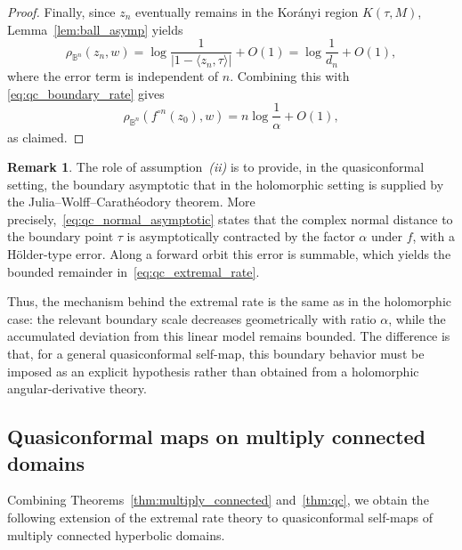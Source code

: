 \documentclass[12pt]{amsart}
\numberwithin{equation}{section}
\theoremstyle{plain}
\theoremstyle{definition}
\newtheorem{remark}[equation]{Remark}
\begin{document}
\begin{proof}
Finally, since $z_n$ eventually remains in the Kor\'anyi region
$K(\tau,M)$, Lemma~\ref{lem:ball_asymp} yields
\begin{equation*}
\rho_{\mathbb{B}^n}(z_n,w)
=
\log\frac{1}{|1-\langle z_n,\tau\rangle|}
+
O(1)
=
\log\frac{1}{d_n}+O(1),
\end{equation*}
where the error term is independent of $n$. Combining this with
\eqref{eq:qc_boundary_rate} gives
\begin{equation*}
\rho_{\mathbb{B}^n}(f^{\circ n}(z_0),w)
=
n\log\frac{1}{\alpha}+O(1),
\end{equation*}
as claimed.
\end{proof}

\begin{remark}
\label{rem:qc}
The role of assumption~\emph{(ii)} is to provide, in the
quasiconformal setting, the boundary asymptotic that in the
holomorphic setting is supplied by the Julia--Wolff--Carath\'eodory
theorem. More precisely,~\eqref{eq:qc_normal_asymptotic} states that
the complex normal distance to the boundary point $\tau$ is
asymptotically contracted by the factor $\alpha$ under $f$, with a
H\"older-type error. Along a forward orbit this error is summable,
which yields the bounded remainder in~\eqref{eq:qc_extremal_rate}.

Thus, the mechanism behind the extremal rate is the same as in the
holomorphic case: the relevant boundary scale decreases
geometrically with ratio $\alpha$, while the accumulated deviation
from this linear model remains bounded. The difference is that, for
a general quasiconformal self-map, this boundary behavior must be
imposed as an explicit hypothesis rather than obtained from a
holomorphic angular-derivative theory.
\end{remark}

\subsection{Quasiconformal maps on multiply connected domains}
\label{subsec:qc_multiply}

Combining Theorems~\ref{thm:multiply_connected} and~\ref{thm:qc},
we obtain the following extension of the extremal rate theory to
quasiconformal self-maps of multiply connected hyperbolic domains.
\end{document}
